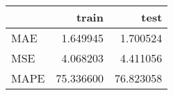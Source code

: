 \begin{tabular}{lrr}
\toprule
{} &      train &       test \\
\midrule
MAE  &   1.649945 &   1.700524 \\
MSE  &   4.068203 &   4.411056 \\
MAPE &  75.336600 &  76.823058 \\
\bottomrule
\end{tabular}
